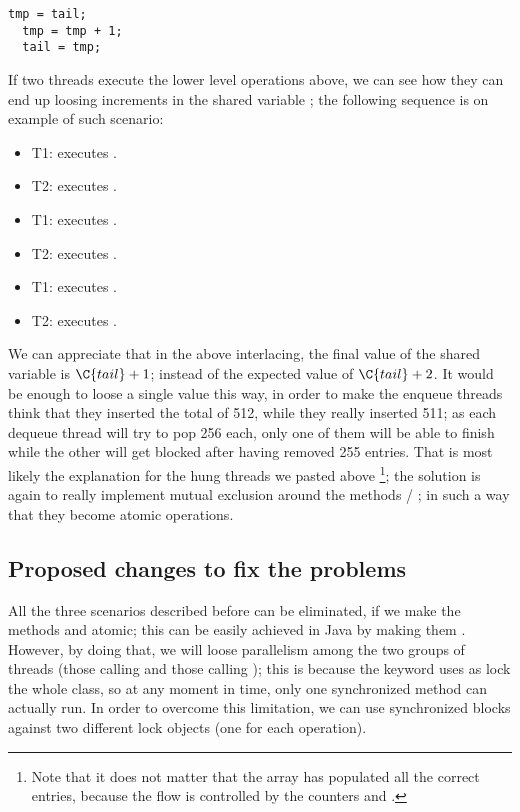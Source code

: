 \begin{lstlisting}[style=nonumbers]
  tmp = tail;
  tmp = tmp + 1;
  tail = tmp;
\end{lstlisting} 
\hfill

If two threads execute the lower level operations above, we can see
how they can end up loosing increments in the shared variable
; the following sequence is on example of such scenario:

\begin{itemize}
\item T1: executes .
\item T2: executes .
\item T1: executes .
\item T2: executes .
\item T1: executes .
\item T2: executes .
\end{itemize}
\hfill

We can appreciate that in the above interlacing, the final value of
the shared variable is $\C{tail} + 1$; instead of the expected value
of $\C{tail} + 2$. It would be enough to loose a single value this
way, in order to make the enqueue threads think that they inserted the
total of 512, while they really inserted 511; as each dequeue thread
will try to pop 256 each, only one of them will be able to finish
while the other will get blocked after having removed 255
entries. That is most likely the explanation for the hung threads we
pasted above \footnote{Note that it does not matter that the array
   has populated all the correct entries, because the flow is
  controlled by the counters  and .}; the solution is
again to really implement mutual 
exclusion around the methods  / ; in such a way that
they become atomic operations.

\subsection{Proposed changes to fix the problems}

All the three scenarios described before can be eliminated, if we make
the methods  and  atomic; this can be easily achieved in
Java by making them . However, by doing that, we will
loose parallelism among the two groups of threads (those calling
 and those calling ); this is because the
 keyword uses as lock the whole class, so at any
moment in time, only one synchronized method can actually run. In
order to overcome this limitation, we can use synchronized blocks
against two different lock objects (one for each operation). \\

